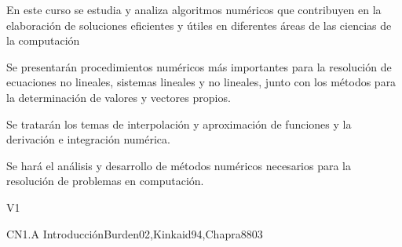 
\begin{syllabus}


\begin{justification}
En este curso se estudia y analiza algoritmos numéricos que
contribuyen en la elaboración de soluciones eficientes y útiles en
diferentes áreas de las ciencias de la computación
\end{justification}

\begin{goals}
\item Se presentarán procedimientos numéricos más importantes para la resolución de 
ecuaciones no lineales, sistemas lineales y no lineales, junto con los métodos 
para la determinación de valores y vectores propios.

\item Se tratarán los temas de interpolación y aproximación de funciones y la 
derivación e integración numérica.

\item Se hará el análisis y desarrollo de métodos numéricos necesarios para la 
resolución de problemas en computación.
\end{goals}

\begin{outcomes}{V1}
\end{outcomes}

\begin{unit}{CN1.A Introducción}{Burden02,Kinkaid94,Chapra88}{0}{3}
\begin{topics}
      \item \CNONETopicFloating
      \item \CNONETopicError
      \item \CNONETopicTaylor
   \end{topics}

   \begin{learningoutcomes}
      \item \CNONEObjONE
      \item \CNONEObjTWO
      \item \CNONEObjTHREE
      \item \CNONEObjFOUR
   \end{learningoutcomes}
\end{unit}


\end{syllabus}
